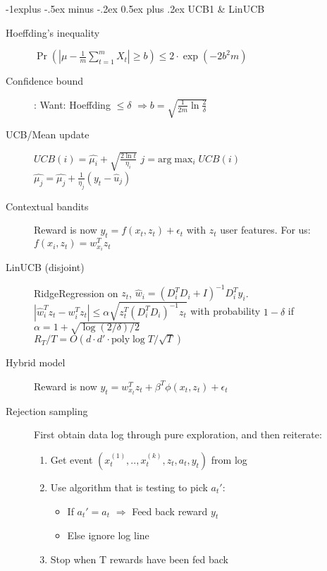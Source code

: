 \documentclass[11pt,landscape]{article}
\makeatletter
\renewcommand{\subsection}{\@startsection{subsection}{2}{0mm}%
                                {-1explus -.5ex minus -.2ex}%
                                {0.5ex plus .2ex}%
                                {\normalfont\normalsize\bfseries}}
\makeatother
\begin{document}
\begin{multicols}{3}
\subsection{UCB1 \& LinUCB}
\begin{description}
    \item[Hoeffding's inequality] $\Pr(|\mu - \frac{1}{m} \sum_{t=1}^m X_t | \geq b) \leq 2 \cdot \exp(-2b^2m)$
    \item[Confidence bound]: Want: Hoeffding $\leq \delta$
        $\Rightarrow b = \sqrt{\frac{1}{2m}\ln\frac{2}{\delta}}$
    \item[UCB/Mean update]
    $UCB(i) = \hat{\mu_i}+ \sqrt{\frac{2 \ln t}{\eta_i}}$
        $j = \text{arg}\max_i UCB(i)$\\
    $\hat{\mu_j} = \hat{\mu_j} + \frac{1}{\eta_j} (y_t - \hat{u}_j)$
    \item[Contextual bandits] Reward is now $y_t = f(x_t,z_t) + \epsilon_t$ with $z_t$ user features. For us: $f(x_i,z_t) = w^T_{x_i}z_t$
    \item[LinUCB (disjoint)] RidgeRegression on $z_t$,
        $\hat{w}_i = (D_i^TD_i + I)^{-1}D_i^Ty_i$.\\
        $|\hat{w}_i^Tz_t - w_i^Tz_t| \leq \alpha \sqrt{z_t^T(D_i^TD_i)^{-1}z_t}$ with
        probability $1-\delta$ if $\alpha = 1 + \sqrt{\log(2/\delta)/2}$\\
        $R_T/T = O(d \cdot d' \cdot \text{poly}\log T / \sqrt{T})$
    \item[Hybrid model] Reward is now $y_t = w^T_{x_t} z_t + \beta^T \phi(x_t,z_t) + \epsilon_t$
    \item[Rejection sampling] First obtain data log through pure exploration, and then reiterate:
    \begin{enumerate}
        \item Get event $(x_t^{(1)},..,x_t^{(k)},z_t,a_t,y_t)$ from log
        \item Use algorithm that is testing to pick $a_t'$:
        \begin{itemize}
            \item If $a_t'  = a_t$
            $\Rightarrow$ Feed back reward $y_t$
            \item Else ignore log line
        \end{itemize}
        \item Stop when T rewards have been fed back
    \end{enumerate}
\end{description}


\end{multicols}
\end{document}
